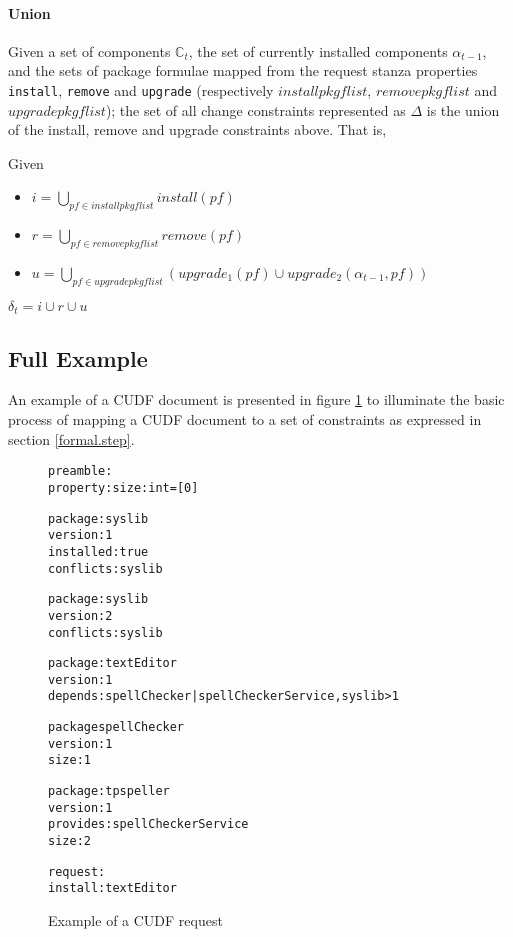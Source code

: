 \paragraph{Union}
Given a set of components $\mathbb{C}_t$, the set of currently installed components $\alpha_{t-1}$,
and the sets of package formulae mapped from the request stanza properties \verb+install+, \verb+remove+ and \verb+upgrade+ 
(respectively $installpkgflist$, $removepkgflist$ and $upgradepkgflist$);
the set of all change constraints represented as $\Delta$ is the union of the install, remove and upgrade constraints above.
That is, 
\begin{defs}
Given 
\begin{itemize}
  \item $i = \bigcup \limits_{pf \in installpkgflist} install(pf)$
  \item $r = \bigcup \limits_{pf \in removepkgflist} remove(pf)$
  \item $u = \bigcup \limits_{pf \in upgradepkgflist} (upgrade_1(pf) \cup upgrade_2(\alpha_{t-1},pf))$
\end{itemize}
$\delta_t =  i \cup r \cup u$
\end{defs}

\subsection{Full Example}
\label{formal.example}
An example of a CUDF document is presented in figure \ref{formal.CUDFEXAMPLE} to illuminate the basic process of mapping a CUDF document to a set of constraints as expressed in section \ref{formal.step}.

\begin{figure}[htp] 
\begin{center}
\begin{alltt}
preamble:
property: size: int = [0]

package: syslib
version: 1
installed: true
conflicts: syslib

package: syslib
version: 2
conflicts: syslib

package: textEditor
version: 1
depends: spellChecker | spellCheckerService, syslib > 1

package spellChecker
version: 1
size: 1

package: tpspeller
version: 1
provides: spellCheckerService
size: 2

request:
install:textEditor

\end{alltt}
  \caption[CUDF Example]{Example of a CUDF request}
  \label{formal.CUDFEXAMPLE}
\end{center}
\end{figure} 

